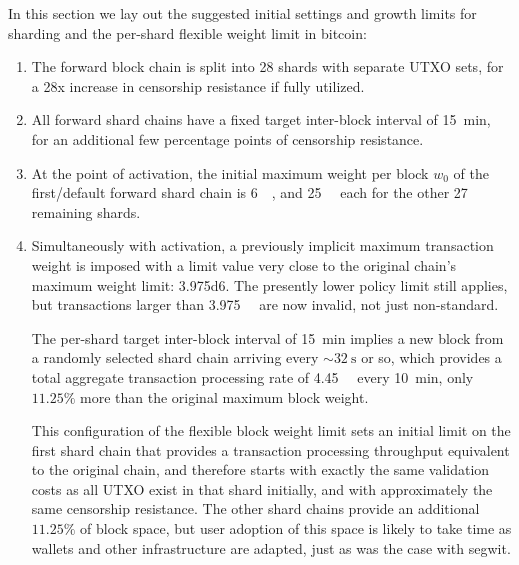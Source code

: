 In this section we lay out the suggested initial settings and growth
limits for sharding and the per-shard flexible weight limit in
bitcoin:

\begin{enumerate}

  \item

    The forward block chain is split into 28 shards with separate UTXO
    sets, for a \num{28}x increase in censorship resistance if fully
    utilized.

  \item

    All forward shard chains have a fixed target inter-block interval
    of \SI{15}{\minute}, for an additional few percentage points of
    censorship resistance.

  \item

    At the point of activation, the initial maximum weight per block
    $w_0$ of the first/default forward shard chain is
    \SI{6}{\mega\weight}, and \SI{25}{\kilo\weight} each for the other
    \num{27} remaining shards.

  \item

    Simultaneously with activation, a previously implicit maximum
    transaction weight is imposed with a limit value very close to the
    original chain's maximum weight limit: \SI{3.975d6}{\weight}.  The
    presently lower policy limit still applies, but transactions
    larger than \SI{3.975}{\mega\weight} are now invalid, not just
    non-standard.

    
The per-shard target inter-block interval of \SI{15}{\minute} implies
a new block from a randomly selected shard chain arriving every
$\sim\SI{32}{\second}$ or so, which provides a total aggregate
transaction processing rate of \SI{4.45}{\mega\weight} every
\SI{10}{\minute}, only $11.25\%$ more than the original maximum block
weight.

This configuration of the flexible block weight limit sets an initial
limit on the first shard chain that provides a transaction processing
throughput equivalent to the original chain, and therefore starts with
exactly the same validation costs as all UTXO exist in that shard
initially, and with approximately the same censorship resistance.  The
other shard chains provide an additional $11.25\%$ of block space, but
user adoption of this space is likely to take time as wallets and
other infrastructure are adapted, just as was the case with segwit.


\end{enumerate}
